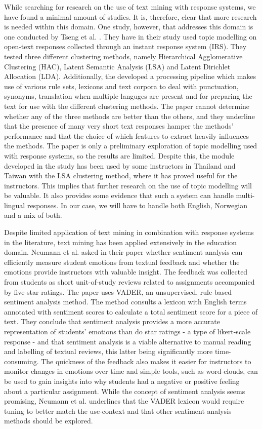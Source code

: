 While searching for research on the use of text mining with response systems, we have found a minimal amount of studies. It is, therefore, clear that more research is needed within this domain. One study, however, that addresses this domain is one conducted by Tseng et al. \cite{tseng2018}. They have in their study used topic modelling on open-text responses collected through an instant response system (IRS). They tested three different clustering methods, namely Hierarchical Agglomerative Clustering (HAC), Latent Semantic Analysis (LSA) and Latent Dirichlet Allocation (LDA). Additionally, the developed a processing pipeline which makes use of various rule sets, lexicons and text corpora to deal with punctuation, synonyms, translation when multiple languges are present and for preparing the text for use with the different clustering methods. The paper cannot determine whether any of the three methods are better than the others, and they underline that the presence of many very short text responses hamper the methods' performance and that the choice of which features to extract heavily influences the methods. The paper is only a preliminary exploration of topic modelling used with response systems, so the results are limited. Despite this, the module developed in the study has been used by some instructors in Thailand and Taiwan with the LSA clustering method, where it has proved useful for the instructors. This implies that further research on the use of topic modelling will be valuable. It also provides some evidence that such a system can handle multi-lingual responses. In our case, we will have to handle both English, Norwegian and a mix of both.

Despite limited application of text mining in combination with response systems in the literature, text mining has been applied extensively in the education domain. Neumann et al. \cite{neumann2021} asked in their paper whether sentiment analysis can efficiently measure student emotions from textual feedback and whether the emotions provide instructors with valuable insight. The feedback was collected from students as short unit-of-study reviews related to assignments accompanied by five-star ratings. The paper uses VADER, an unsupervised, rule-based sentiment analysis method. The method consults a lexicon with English terms annotated with sentiment scores to calculate a total sentiment score for a piece of text. They conclude that sentiment analysis provides a more accurate representation of students' emotions than do star ratings - a type of likert-scale response - and that sentiment analysis is a viable alternative to manual reading and labelling of textual reviews, this latter being significantly more time-consuming. The quickness of the feedback also makes it easier for instructors to monitor changes in emotions over time and simple tools, such as word-clouds, can be used to gain insights into why students had a negative or positive feeling about a particular assignment. While the concept of sentiment analysis seems promising, Neumann et al. underlines that the VADER lexicon would require tuning to better match the use-context and that other sentiment analysis methods should be explored.

